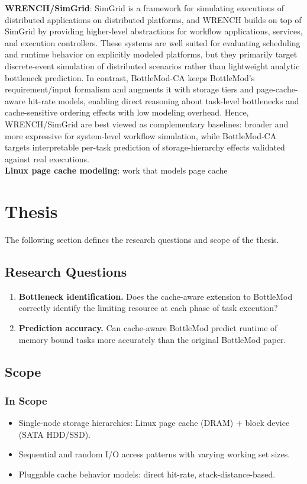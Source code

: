 \documentclass[11pt,a4paper]{article}
\begin{document}
\textbf{WRENCH/SimGrid}: SimGrid is a framework for simulating executions of distributed applications on distributed platforms, and WRENCH builds on top of SimGrid by providing higher-level abstractions for workflow applications, services, and execution controllers. These systems are well suited for evaluating scheduling and runtime behavior on explicitly modeled platforms, but they primarily target discrete-event simulation of distributed scenarios rather than lightweight analytic bottleneck prediction. In contrast, BottleMod-CA keeps BottleMod's requirement/input formalism and augments it with storage tiers and page-cache-aware hit-rate models, enabling direct reasoning about task-level bottlenecks and cache-sensitive ordering effects with low modeling overhead. Hence, WRENCH/SimGrid are best viewed as complementary baselines: broader and more expressive for system-level workflow simulation, while BottleMod-CA targets interpretable per-task prediction of storage-hierarchy effects validated against real executions. \\
\textbf{Linux page cache modeling}: work that models page cache
\section{Thesis}
The following section defines the research questions and scope of the thesis.
\subsection{Research Questions}
\begin{enumerate}[nosep,label=\textbf{RQ\arabic*:}]
	\item \textbf{Bottleneck identification.} Does the cache-aware extension to BottleMod correctly identify the limiting resource at each phase of task execution?
	\item \textbf{Prediction accuracy.} Can cache-aware BottleMod predict runtime of memory bound tasks more accurately than the original BottleMod paper.
\end{enumerate}

\subsection{Scope}

\subsubsection{In Scope}
\begin{itemize}[nosep]
	\item Single-node storage hierarchies: Linux page cache (DRAM) + block device (SATA HDD/SSD).
	\item Sequential and random I/O access patterns with varying working set sizes.
	\item Pluggable cache behavior models: direct hit-rate, stack-distance-based.
\end{itemize}
\end{document}
